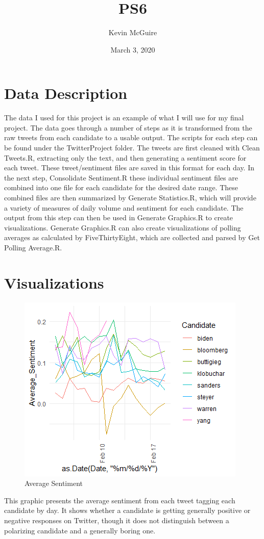 \documentclass{article}
\title{PS6}
\author{Kevin McGuire}
\date{March 3, 2020}
\begin{document}
\maketitle

\section{Data Description}
The data I used for this project is an example of what I will use for my final project. The data goes through a number of steps as it is transformed from the raw tweets from each candidate to a usable output. The scripts for each step can be found under the TwitterProject folder. The tweets are first cleaned with Clean Tweets.R, extracting only the text, and then generating a sentiment score for each tweet. These tweet/sentiment files are saved in this format for each day. In the next step, Consolidate Sentiment.R these individual sentiment files are combined into one file for each candidate for the desired date range. These combined files are then summarized by Generate Statistics.R, which will provide a variety of measures of daily volume and sentiment for each candidate. The output from this step can then be used in Generate Graphics.R to create visualizations.
\newline
\newline
Generate Graphics.R can also create visualizations of polling averages as calculated by FiveThirtyEight, which are collected and parsed by Get Polling Average.R.

\section{Visualizations}
\begin{figure}[h!]
    \centering
    \includegraphics[width=.4\linewidth]{Average_Sentiment.png}
    \caption{Average Sentiment}
\end{figure}

This graphic presents the average sentiment from each tweet tagging each candidate by day. It shows whether a candidate is getting generally positive or negative responses on Twitter, though it does not distinguish between a polarizing candidate and a generally boring one.
\end{document}
